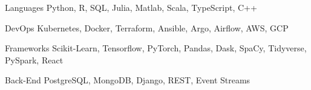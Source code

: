 

\begin{cvskills}

  \cvskill
    {Languages} %
    {Python, R, SQL, Julia, Matlab, Scala, TypeScript, C++} %

  \cvskill
    {DevOps} %
    {Kubernetes, Docker, Terraform, Ansible, Argo, Airflow, AWS, GCP} %

  \cvskill
    {Frameworks} %
    {Scikit-Learn, Tensorflow, PyTorch, Pandas, Dask, SpaCy, Tidyverse, PySpark, React} %

  \cvskill
    {Back-End} %
    {PostgreSQL, MongoDB, Django, REST, Event Streams} %

\end{cvskills}
